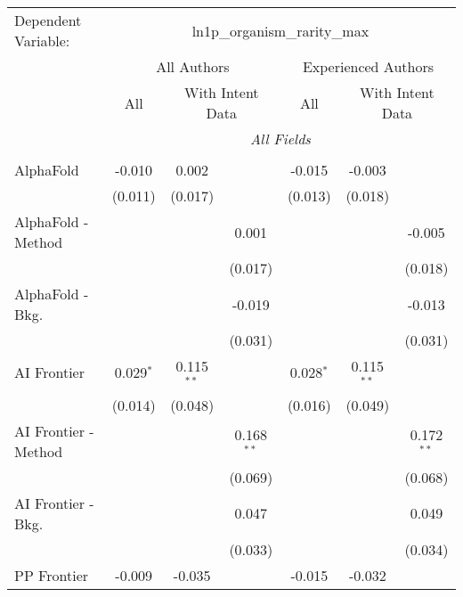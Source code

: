 \begingroup
\centering
\begin{tabular}{lcccccc}
   \tabularnewline \midrule \midrule
   Dependent Variable: & \multicolumn{6}{c}{ln1p\_organism\_rarity\_max}\\
 & \multicolumn{3}{c}{All Authors} & \multicolumn{3}{c}{Experienced Authors} \\
\cmidrule(lr){2-4} \cmidrule(lr){5-7}
 & \multicolumn{1}{c}{All} & \multicolumn{2}{c}{With Intent Data} & \multicolumn{1}{c}{All} & \multicolumn{2}{c}{With Intent Data} \\
\cmidrule(lr){2-2} \cmidrule(lr){3-4} \cmidrule(lr){5-5} \cmidrule(lr){6-7}
 & \multicolumn{6}{c}{\textit{All Fields}} \\ \\
   AlphaFold            & -0.010      & 0.002        &               & -0.015      & -0.003       &   \\   
                        & (0.011)     & (0.017)      &               & (0.013)     & (0.018)      &   \\   
   AlphaFold - Method   &             &              & 0.001         &             &              & -0.005\\   
                        &             &              & (0.017)       &             &              & (0.018)\\   
   AlphaFold - Bkg.     &             &              & -0.019        &             &              & -0.013\\   
                        &             &              & (0.031)       &             &              & (0.031)\\   
   AI Frontier          & 0.029$^{*}$ & 0.115$^{**}$ &               & 0.028$^{*}$ & 0.115$^{**}$ &   \\   
                        & (0.014)     & (0.048)      &               & (0.016)     & (0.049)      &   \\   
   AI Frontier - Method &             &              & 0.168$^{**}$  &             &              & 0.172$^{**}$\\   
                        &             &              & (0.069)       &             &              & (0.068)\\   
   AI Frontier - Bkg.   &             &              & 0.047         &             &              & 0.049\\   
                        &             &              & (0.033)       &             &              & (0.034)\\   
   PP Frontier          & -0.009      & -0.035       &               & -0.015      & -0.032       &   \\   

\end{tabular}

